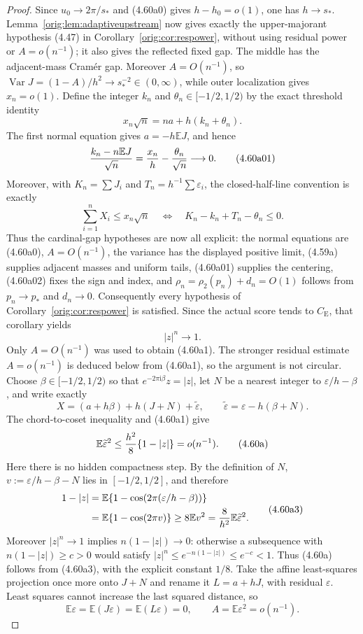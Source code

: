 \documentclass[11pt,a4paper]{article}
\numberwithin{equation}{section}
\theoremstyle{definition}
\theoremstyle{remark}
\newcommand{\E}{\mathbb E}
\newcommand{\ii}{\mathrm i}
\newcommand{\CE}{C_{\mathrm E}}
\begin{document}
\begin{proof}
Since $u_0\to2\pi/s_*$ and (4.60a0) gives $h-h_0=o(1)$, one has
$h\to s_*$.  Lemma~\ref{orig:lem:adaptiveupstream} now gives exactly the
upper-majorant hypothesis (4.47) in Corollary~\ref{orig:cor:respower}, without
using residual power or $A=o(n^{-1})$; it also gives the reflected fixed
gap.  The middle has the adjacent-mass Cram\'er gap.  Moreover
$A=O(n^{-1})$, so
$\operatorname {Var}J=(1-A)/h^2\to s_*^{-2}\in(0,\infty)$, while outer
localization gives $x_n=o(1)$.  Define the integer $k_n$ and
$\theta_n\in[-1/2,1/2)$ by the exact threshold identity
\[
 x_n\sqrt n=na+h(k_n+\theta_n).                        \tag{4.60a00}
\]
The first normal equation gives $a=-h\E J$, and hence
\[
 {k_n-n\E J\over\sqrt n}
 ={x_n\over h}-{\theta_n\over\sqrt n}\longrightarrow0. \tag{4.60a01}
\]
Moreover, with $K_n=\sum J_i$ and
$T_n=h^{-1}\sum\varepsilon_i$, the closed-half-line convention is exactly
\[
 \sum_{i=1}^nX_i\le x_n\sqrt n
 \quad\Longleftrightarrow\quad
 K_n-k_n+T_n-\theta_n\le0.                             \tag{4.60a02}
\]
Thus the cardinal-gap hypotheses are now all explicit: the normal
equations are (4.60a0), $A=O(n^{-1})$, the variance has the displayed
positive limit, (4.59a) supplies adjacent masses and uniform tails,
(4.60a01) supplies the centering, (4.60a02) fixes the sign and index, and
\(\rho_n=\rho_2(p_n)+d_n=O(1)\) follows from \(p_n\to p_*\) and
\(d_n\to0\).
Consequently every hypothesis of Corollary~\ref{orig:cor:respower} is
satisfied.  Since
the actual score tends to $\CE$, that corollary yields
\[
                              |z|^n\longrightarrow1.  \tag{4.60a1}
\]
Only \(A=O(n^{-1})\) was used to obtain (4.60a1).  The stronger residual
estimate \(A=o(n^{-1})\) is deduced below from (4.60a1), so the argument is
not circular.
Choose $\beta\in[-1/2,1/2)$ so that
$e^{-2\pi\ii\beta}z=|z|$, let $N$ be a nearest integer to
$\varepsilon/h-\beta$, and write exactly
\[
 X=(a+h\beta)+h(J+N)+\widetilde\varepsilon,\qquad
 \widetilde\varepsilon=\varepsilon-h(\beta+N).       \tag{4.60a2}
\]
The chord-to-coset inequality and (4.60a1) give
\[
 \E\widetilde\varepsilon^2
 \le {h^2\over8}\{1-|z|\}=o(n^{-1}).                 \tag{4.60a}
\]
Here there is no hidden compactness step.  By the definition of $N$,
$v:=\varepsilon/h-\beta-N$ lies in $[-1/2,1/2]$, and therefore
\[
\begin{split}
 1-|z|
 &=\E\{1-\cos(2\pi(\varepsilon/h-\beta))\}\\
 &=\E\{1-\cos(2\pi v)\}
 \ge8\E v^2={8\over h^2}\E\widetilde\varepsilon^2.
\end{split}                                           \tag{4.60a3}
\]
Moreover $|z|^n\to1$ implies $n(1-|z|)\to0$: otherwise a subsequence
with $n(1-|z|)\ge c>0$ would satisfy
$|z|^n\le e^{-n(1-|z|)}\le e^{-c}<1$.  Thus (4.60a) follows from
(4.60a3), with the explicit constant $1/8$.
Take the affine least-squares projection once more onto $J+N$ and rename
it $L=a+hJ$, with residual $\varepsilon$.  Least squares cannot increase
the last squared distance, so
\[
 \E\varepsilon=\E(J\varepsilon)=\E(L\varepsilon)=0,
 \qquad A=\E\varepsilon^2=o(n^{-1}).                  \tag{4.61}
\]


\end{proof}
\end{document}
